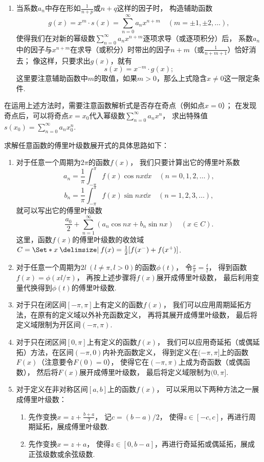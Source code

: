 \begin{enumerate}
\begin{enumerate}
	\item 当系数\(a_n\)中存在形如\(\frac{1}{n+p}\)或\(n+q\)这样的因子时，
	构造辅助函数\[
		g(x) = x^m \cdot s(x) = \sum\limits_{n=0}^\infty a_n x^{n+m}
		\quad(m=\pm1,\pm2,\dotsc),
	\]
	使得我们在对新的幂级数\(\sum\limits_{n=0}^\infty a_n x^{n+m}\)逐项求导（或逐项积分）后，
	系数\(a_n\)中的因子与\(x^{n+m}\)在求导（或积分）时带出的因子\(n+m\)（或\(\frac{1}{n+m+1}\)）恰好消去；
	像这样，只要求出\(g(x)\)，就有\[
		s(x) = x^{-m} \cdot g(x);
	\]
	这里要注意辅助函数中\(m\)的取值，如果\(m>0\)，那么上式隐含\(x\neq0\)这一限定条件.
\end{enumerate}
在运用上述方法时，需要注意函数解析式是否存在奇点（例如点\(x=0\)）；
在发现奇点后，可以将奇点\(x=x_0\)代入幂级数\(\sum\limits_{n=0}^\infty a_n x^n\)，
求出特殊值\(s(x_0) = \sum\limits_{n=0}^\infty a_n x_0^n\).
\end{enumerate}


求解任意函数的傅里叶级数展开式的具体思路如下：
\begin{enumerate}
\item 对于任意一个周期为\(2\pi\)的函数\(f(x)\)，
我们只要计算出它的傅里叶系数\[
a_n = \frac{1}{\pi} \int_{-\pi}^{\pi} f(x) \cos nx \dd{x}
\quad(n=0,1,2,\dotsc),
\]\[
b_n = \frac{1}{\pi} \int_{-\pi}^{\pi} f(x) \sin nx \dd{x}
\quad(n=1,2,3,\dotsc),
\]就可以写出它的傅里叶级数\[
\frac{a_0}{2} + \sum\limits_{n=1}^\infty (a_n \cos nx + b_n \sin nx)
\quad(x \in C).
\]
这里，函数\(f(x)\)的傅里叶级数的收敛域\(C = \Set*{
	x \given
	f(x) = \frac{1}{2} [ f(x^-) + f(x^+) ]
}\).

\item 对于任意一个周期为\(2l\ (l\neq\pi,l>0)\)的函数\(\phi(t)\)，
令\(\frac{x}{\pi} = \frac{t}{l}\)，
得到函数\(f(x) = \phi(xl/\pi)\)，
再按上述步骤将\(f(x)\)展开成傅里叶级数，
最后利用变量代换得到\(\phi(t)\)的傅里叶级数.

\item 对于只在闭区间\([-\pi,\pi]\)上有定义的函数\(f(x)\)，
我们可以应用周期延拓方法，在原有的定义域以外补充函数定义，
再将其展开成傅里叶级数，
最后将定义域限制为开区间\((-\pi,\pi)\).

\item 对于只在闭区间\([0,\pi]\)上有定义的函数\(f(x)\)，
我们可以应用奇延拓（或偶延拓）方法，在区间\((-\pi,0)\)内补充函数定义，
得到定义在\((-\pi,\pi]\)上的函数\(F(x)\)（注意要令\(F(0) = 0\)），
使得它在\((-\pi,\pi)\)上成为奇函数（或偶函数），
然后将\(F(x)\)展开成傅里叶级数，
最后将定义域限制为\((0,\pi]\).

\item 对于定义在非对称区间\([a,b]\)上的函数\(f(x)\)，
可以采用以下两种方法之一展成傅里叶级数：
	\begin{enumerate}
		\item 先作变换\(x = z + \frac{b+a}{2}\)，
		记\(c = (b-a)/2\)，
		使得\(z\in[-c,c]\)，再进行周期延拓，展成傅里叶级数.
		\item 先作变换\(x = z + a\)，
		使得\(z\in[0,b-a]\)，再进行奇延拓或偶延拓，展成正弦级数或余弦级数.
	\end{enumerate}
\end{enumerate}

\endgroup
